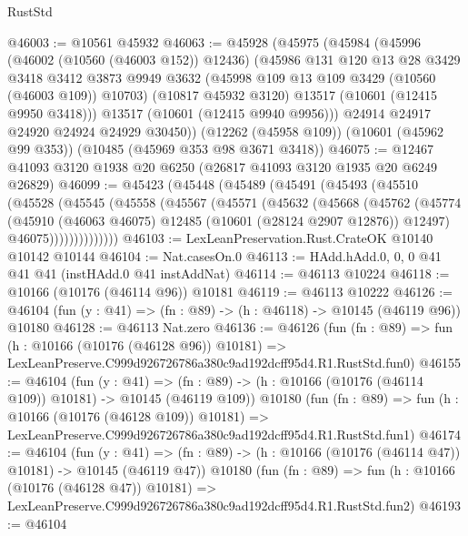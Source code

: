 \begin{lexlean}{RustStd}
\begin{coremodule}
@46003 := @10561 @45932
@46063 := @45928
    (@45975
      (@45984
        (@45996
          (@46002 (@10560 (@46003 @152)) @12436)
          (@45986
            @131
            @120
            @13
            @28
            @3429
            @3418
            @3412
            @3873
            @9949
            @3632
            (@45998 @109 @13 @109 @3429 (@10560 (@46003 @109)) @10703)
            (@10817 @45932 @3120)
            @13517
            (@10601 (@12415 @9950 @3418)))
          @13517
          (@10601 (@12415 @9940 @9956)))
        @24914
        @24917
        @24920
        @24924
        @24929
        @30450))
    (@12262 (@45958 @109))
    (@10601 (@45962 @99 @353))
    (@10485 (@45969 @353 @98 @3671 @3418))
@46075 := @12467 @41093 @3120 @1938 @20 @6250 (@26817 @41093 @3120 @1935 @20 @6249 @26829)
@46099 := @45423
    (@45448
      (@45489
        (@45491
          (@45493
            (@45510
              (@45528
                (@45545
                  (@45558
                    (@45567
                      (@45571
                        (@45632
                          (@45668
                            (@45762
                              (@45774
                                (@45910
                                  (@46063 @46075)
                                  @12485
                                  (@10601 (@28124 @2907 @12876))
                                  @12497)
                                @46075))))))))))))))
@46103 := LexLeanPreservation.Rust.CrateOK @10140 @10142 @10144
@46104 := Nat.casesOn.{0}
@46113 := HAdd.hAdd.{0, 0, 0} @41 @41 @41 (instHAdd.{0} @41 instAddNat)
@46114 := @46113 @10224
@46118 := @10166 (@10176 (@46114 @96)) @10181
@46119 := @46113 @10222
@46126 := @46104 (fun (y : @41) => (fn : @89) -> (h : @46118) -> @10145 (@46119 @96)) @10180
@46128 := @46113 Nat.zero
@46136 := @46126
    (fun (fn : @89) =>
    fun (h : @10166 (@10176 (@46128 @96)) @10181) =>
    LexLeanPreserve.C999d926726786a380c9ad192dcff95d4.R1.RustStd.fun0)
@46155 := @46104
    (fun (y : @41) =>
    (fn : @89) -> (h : @10166 (@10176 (@46114 @109)) @10181) -> @10145 (@46119 @109))
    @10180
    (fun (fn : @89) =>
    fun (h : @10166 (@10176 (@46128 @109)) @10181) =>
    LexLeanPreserve.C999d926726786a380c9ad192dcff95d4.R1.RustStd.fun1)
@46174 := @46104
    (fun (y : @41) =>
    (fn : @89) -> (h : @10166 (@10176 (@46114 @47)) @10181) -> @10145 (@46119 @47))
    @10180
    (fun (fn : @89) =>
    fun (h : @10166 (@10176 (@46128 @47)) @10181) =>
    LexLeanPreserve.C999d926726786a380c9ad192dcff95d4.R1.RustStd.fun2)
@46193 := @46104

\end{coremodule}
\end{lexlean}
